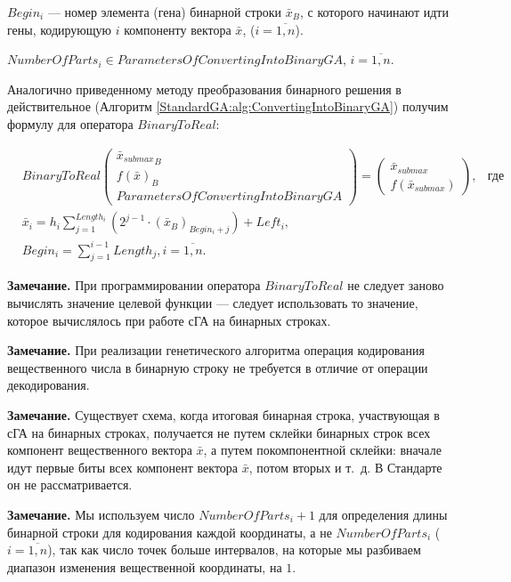 $ Begin_i $ --- номер элемента (гена) бинарной строки $ \bar{x}_B $, с которого начинают идти гены, кодирующую $ i $ компоненту вектора $ \bar{x} $, ($ i=\overline{1,n} $).

$NumberOfParts_i \in ParametersOfConvertingIntoBinaryGA $, $i=\overline{1,n}$.

Аналогично приведенному методу преобразования бинарного решения в действительное (Алгоритм \ref{StandardGA:alg:ConvertingIntoBinaryGA}) получим формулу для оператора $ BinaryToReal $:

\begin{align}
\label{StandardGA:eq:BinaryToReal}
&BinaryToReal\left( \begin{array}{c}\bar{x}{{}_{submax}}_B \\f\left(\bar{x} \right)_B \\ParametersOfConvertingIntoBinaryGA
\end{array}\right) =\left( \begin{array}{c}\bar{x}_{submax} \\f\left(\bar{x}_{submax} \right)
\end{array}\right),&\text{где } \\
&\bar{x}_i=h_i \sum_{j=1}^{Length_i} \left( 2^{j-1}\cdot {\left( \bar{x}_B\right) }_{Begin_i+j} \right)+Left_i,\nonumber \\
& Begin_i =\sum_{j=1}^{i-1}Length_j, i=\overline{1,n}.\nonumber
\end{align}

\textbf{Замечание.} При программировании оператора $ BinaryToReal $ не следует заново вычислять значение целевой функции --- следует использовать то значение, которое вычислялось при работе сГА на бинарных строках.

\textbf{Замечание.} При реализации генетического алгоритма операция кодирования вещественного числа в бинарную строку не требуется в отличие от операции декодирования.

\textbf{Замечание.} Существует схема, когда итоговая бинарная строка, участвующая в сГА на бинарных строках, получается не путем склейки бинарных строк всех компонент вещественного вектора $\bar{x}$, а путем покомпонентной склейки: вначале идут первые биты всех компонент вектора  $\bar{x}$, потом вторых и т.~д. В Стандарте он не рассматривается.

\textbf{Замечание.} Мы используем число $ NumberOfParts_i+1 $ для определения длины бинарной строки для кодирования каждой координаты, а не $ NumberOfParts_i $ ($i=\overline{1,n}$), так как число точек больше интервалов, на которые мы разбиваем диапазон изменения вещественной координаты, на $ 1 $.

